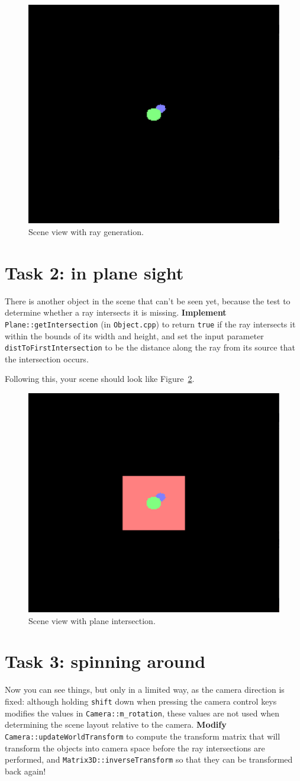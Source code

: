 \documentclass{../../../fal_assignment}
\begin{document}
\begin{figure}[ht]
	\begin{center}
		\includegraphics[width=0.25\linewidth]{spheres}
	\end{center}
	\caption{Scene view with ray generation.}
	\label{fig:spheres}
\end{figure}

\section*{Task 2: in plane sight}

There is another object in the scene that can't be seen yet, because the test to determine whether a ray intersects it is missing. \textbf{Implement} \lstinline{Plane::getIntersection} (in \texttt{Object.cpp}) to return \lstinline{true} if the ray intersects it within the bounds of its width and height, and set the input parameter \lstinline{distToFirstIntersection} to be the distance along the ray from its source that the intersection occurs.

Following this, your scene should look like Figure~\ref{fig:plane}.

\begin{figure}[ht]
	\begin{center}
		\includegraphics[width=0.25\linewidth]{plane}
	\end{center}
	\caption{Scene view with plane intersection.}
	\label{fig:plane}
\end{figure}

\section*{Task 3: spinning around}

Now you can see things, but only in a limited way, as the camera direction is fixed: although holding \texttt{shift} down when pressing the camera control keys modifies the values in \lstinline{Camera::m_rotation}, these values are not used when determining the scene layout relative to the camera. \textbf{Modify} \lstinline{Camera::updateWorldTransform} to compute the transform matrix that will transform the objects into camera space before the ray intersections are performed, and \lstinline{Matrix3D::inverseTransform} so that they can be transformed back again!
\end{document}
